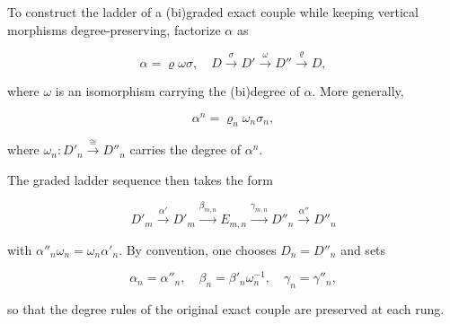 To construct the ladder of a (bi)graded exact couple while keeping vertical morphisms degree-preserving, factorize $\alpha$ as

$$\alpha = \varrho\omega\sigma, \quad D \xrightarrow{\sigma} D' \xrightarrow{\omega} D'' \xrightarrow{\varrho} D,$$

where $\omega$ is an isomorphism carrying the (bi)degree of $\alpha$. More generally,

$$\alpha^n = \varrho_n \omega_n \sigma_n,$$

where $\omega_n: D'_n \xrightarrow{\cong} D''_n$ carries the degree of $\alpha^n$.

The graded ladder sequence then takes the form

$$D'_m \xrightarrow{\alpha'} D'_m \xrightarrow{\beta_{m,n}} E_{m,n} \xrightarrow{\gamma_{m,n}} D''_n \xrightarrow{\alpha''} D''_n$$

with $\alpha''_n \omega_n = \omega_n \alpha'_n$. By convention, one chooses $D_n = D''_n$ and sets

$$\alpha_n = \alpha''_n, \quad \beta_n = \beta'_n \omega_n^{-1}, \quad \gamma_n = \gamma''_n,$$

so that the degree rules of the original exact couple are preserved at each rung.
